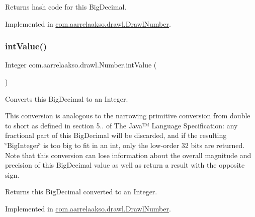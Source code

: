 \begin{DoxyReturn}{Returns}
hash code for this Big\+Decimal. 
\end{DoxyReturn}


Implemented in \hyperlink{classcom_1_1aarrelaakso_1_1drawl_1_1_drawl_number_a0048361007923e4b902a4581eb9ba45c}{com.\+aarrelaakso.\+drawl.\+Drawl\+Number}.

\mbox{\label{interfacecom_1_1aarrelaakso_1_1drawl_1_1_number_a82bd01108e6f99cba2e83759fa363f39}} 
\subsubsection{\texorpdfstring{int\+Value()}{intValue()}}
{\footnotesize\ttfamily Integer com.\+aarrelaakso.\+drawl.\+Number.\+int\+Value (\begin{DoxyParamCaption}{ }\end{DoxyParamCaption})}



Converts this Big\+Decimal to an Integer. 

This conversion is analogous to the narrowing primitive conversion from double to short as defined in section 5.. of The Java™ Language Specification\+: any fractional part of this Big\+Decimal will be discarded, and if the resulting \char`\"{}\+Big\+Integer\char`\"{} is too big to fit in an int, only the low-\/order 32 bits are returned. Note that this conversion can lose information about the overall magnitude and precision of this Big\+Decimal value as well as return a result with the opposite sign.

\begin{DoxyReturn}{Returns}
this Big\+Decimal converted to an Integer. 
\end{DoxyReturn}


Implemented in \hyperlink{classcom_1_1aarrelaakso_1_1drawl_1_1_drawl_number_a8022d04415c5449344ac1e23658f8802}{com.\+aarrelaakso.\+drawl.\+Drawl\+Number}.

\mbox{\label{interfacecom_1_1aarrelaakso_1_1drawl_1_1_number_aa8ef6fc2e77da054f3a42f2cd81ec8a6}} 

